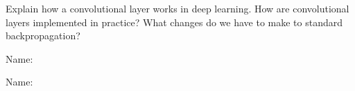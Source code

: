 \documentclass[11pt]{article}
\newcounter{marks}
\begin{document}
\begin{list}{{\bf Question :}}
\item
{}
\addtocounter{marks}{1}
Explain how a convolutional layer works in deep learning. How are convolutional layers implemented in practice? What changes do we have to make to standard backpropagation?

\framebox[16cm][l]{ 
\parbox{15.9cm}{
\vspace*{6.5cm}
}}



\pagebreak

Name: \dotfill

\item
{}
\addtocounter{marks}{1}


\framebox[16cm][l]{ 
\parbox{15.9cm}{
\vspace*{9cm}
}}

\item
{}
\addtocounter{marks}{1}


\framebox[16cm][l]{ 
\parbox{15.9cm}{
\vspace*{9cm}
}}



\pagebreak

Name: \dotfill


\end{list}
\end{document}
